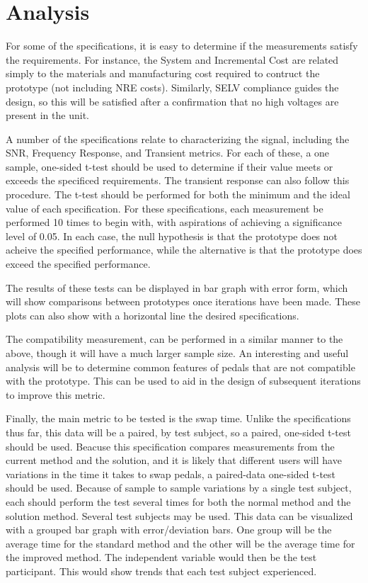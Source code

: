 \documentclass{article}
\begin{document}
\section{Analysis}
	For some of the specifications, it is easy to determine if the measurements satisfy the requirements.  For instance, the System and Incremental Cost are related simply to the materials and manufacturing cost required to contruct the prototype (not including NRE costs).  Similarly, SELV compliance guides the design, so this will be satisfied after a confirmation that no high voltages are present in the unit.

	A number of the specifications relate to characterizing the signal, including the SNR, Frequency Response, and Transient metrics.  For each of these, a one sample, one-sided t-test should be used to determine if their value meets or exceeds the specificed requirements.  The transient response can also follow this procedure.  The t-test should be performed for both the minimum and the ideal value of each specification.  For these specifications, each measurement be performed 10 times to begin with, with aspirations of achieving a significance level of 0.05.  In each case, the null hypothesis is that the prototype does not acheive the specified performance, while the alternative is that the prototype does exceed the specified performance.

	The results of these tests can be displayed in bar graph with error form, which will show comparisons between prototypes once iterations have been made.  These plots can also show with a horizontal line the desired specifications.

	The compatibility measurement, can be performed in a similar manner to the above, though it will have a much larger sample size.  An interesting and useful analysis will be to determine common features of pedals that are not compatible with the prototype.  This can be used to aid in the design of subsequent iterations to improve this metric.

	Finally, the main metric to be tested is the swap time.  Unlike the specifications thus far, this data will be a paired, by test subject, so a paired, one-sided t-test should be used.  Beacuse this specification compares measurements from the current method and the solution, and it is likely that different users will have variations in the time it takes to swap pedals, a paired-data one-sided t-test should be used.  Because of sample to sample variations by a single test subject, each should perform the test several times for both the normal method and the solution method.  Several test subjects may be used.  This data can be visualized with a grouped bar graph with error/deviation bars.  One group will be the average time for the standard method and the other will be the average time for the improved method.  The independent variable would then be the test participant.  This would show trends that each test subject experienced.
\end{document}
